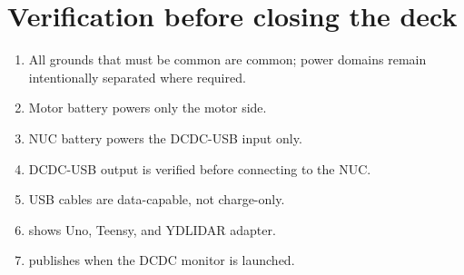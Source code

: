 \section{Verification before closing the deck}
\begin{enumerate}
  \item All grounds that must be common are common; power domains remain intentionally separated where required.
  \item Motor battery powers only the motor side.
  \item NUC battery powers the DCDC-USB input only.
  \item DCDC-USB output is verified before connecting to the NUC.
  \item USB cables are data-capable, not charge-only.
  \item {} shows Uno, Teensy, and YDLIDAR adapter.
  \item {} publishes when the DCDC monitor is launched.
\end{enumerate}
